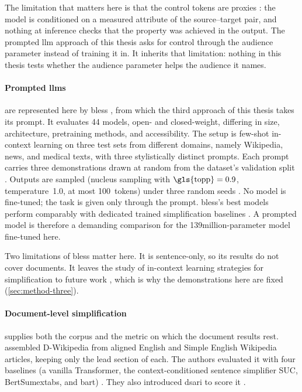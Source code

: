 \pagebreak

The limitation that matters here is that the control tokens are proxies \parencite[4691]{martin-etal-2020-controllable}: the model is conditioned on a measured attribute of the source--target pair, and nothing at inference checks that the property was achieved in the output.
The prompted \gls{llm} approach of this thesis asks for control through the audience parameter instead of training it in.
It inherits that limitation: nothing in this thesis tests whether the audience parameter helps the audience it names.

\paragraph{Prompted \glspl{llm}} are represented here by \gls{bless} \parencite[13291]{kew-etal-2023-bless}, from which the third approach of this thesis takes its prompt.
It evaluates 44 models, open- and closed-weight, differing in size, architecture, pretraining methods, and accessibility.
The setup is few-shot in-context learning on three test sets from different domains, namely Wikipedia, news, and medical texts, with three stylistically distinct prompts.
Each prompt carries three demonstrations drawn at random from the dataset's validation split \parencite[13293]{kew-etal-2023-bless}.
Outputs are sampled (nucleus sampling with \(\text{\gls{topp}} = 0.9\), temperature~\num{1.0}, at most \num{100}~tokens) under three random seeds \parencite[13293]{kew-etal-2023-bless}.
No model is fine-tuned; the task is given only through the prompt.
\Gls{bless}'s best models perform comparably with dedicated trained simplification baselines \parencite[13291]{kew-etal-2023-bless}.
A prompted model is therefore a demanding comparison for the 139\gls{million}-parameter model fine-tuned here.

Two limitations of \gls{bless} matter here.
It is sentence-only, so its results do not cover documents.
It leaves the study of in-context learning strategies for simplification to future work \parencite[13293]{kew-etal-2023-bless}, which is why the demonstrations here are fixed (\cref{sec:method-three}).

\paragraph{Document-level simplification} supplies both the corpus and the metric on which the document results rest.
\textcite[7999]{sun-etal-2021-document} assembled D-Wikipedia from aligned English and Simple English Wikipedia articles, keeping only the lead section of each.
The authors evaluated it with four baselines (a vanilla Transformer, the context-conditioned sentence simplifier SUC, BertSumextabs, and \gls{bart}) \parencite[8003]{sun-etal-2021-document}.
They also introduced \gls{dsari} to score it \parencite[8002]{sun-etal-2021-document}.

